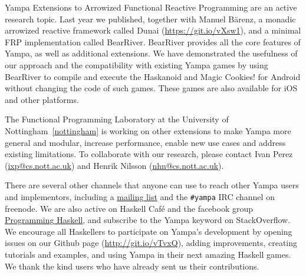 \begin{hcarentry}[updated]{Yampa}
Extensions to Arrowized Functional Reactive Programming are an active research
topic. Last year we published, together with Manuel B\"arenz, a monadic
arrowized reactive framework called Dunai
(\href{https://git.io/vXsw1}{https://git.io/vXsw1}), and a minimal FRP
implementation called BearRiver. BearRiver provides all the core features of
Yampa, as well as additional extensions. We have demonstrated the usefulness
of our approach and the compatibility with existing Yampa games by using
BearRiver to compile and execute the Haskanoid and Magic Cookies! for Android
without changing the code of such games. These games are also available for
iOS and other platforms.

The Functional Programming Laboratory at the University of
Nottingham~\cref{nottingham} is working on other extensions to make Yampa more
general and modular, increase performance, enable new use cases and address
existing limitations. To collaborate with our research, please contact Ivan
Perez (\href{mailto:ixp@cs.nott.ac.uk}{ixp@cs.nott.ac.uk}) and Henrik Nilsson
(\href{mailto:nhn@cs.nott.ac.uk}{nhn@cs.nott.ac.uk}).

There are several other channels that anyone can use to reach other Yampa users
and implementors, including a
\href{http://mailman.cs.yale.edu/mailman/listinfo/yampa-users}{mailing list}
and the \texttt{\#yampa} IRC channel on freenode. We are also active on Haskell
Caf\'e and the facebook group
\href{https://www.facebook.com/groups/programming.haskell/}{Programming
    Haskell}, and subscribe to the Yampa keyword on StackOverflow. We encourage
all Haskellers to participate on Yampa's development by opening issues on our
Github page (\href{http://git.io/vTvxQ}{http://git.io/vTvxQ}), adding
improvements, creating tutorials and examples, and using Yampa in their next
amazing Haskell games. We thank the kind users who have already sent us their
contributions.
\end{hcarentry}

